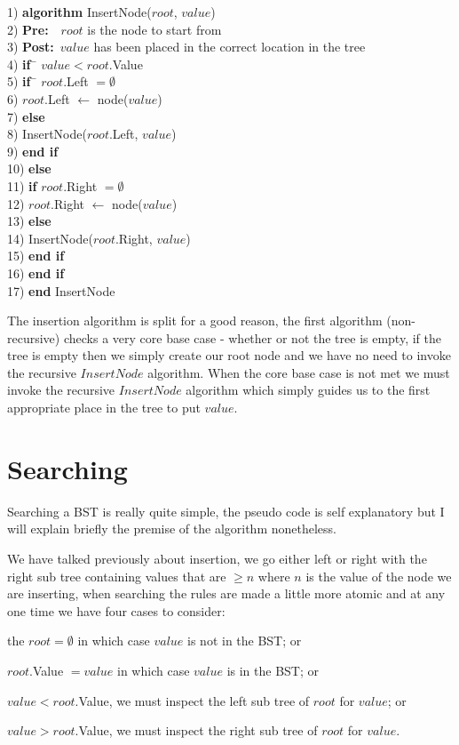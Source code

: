 \begin{tabbing}
1)  \textbf{alg}\= \textbf{orithm} InsertNode($root$, $value$) \\
2)  \> \textbf{Pre:}~~$root$ is the node to start from \\
3)  \> \textbf{Post:}~$value$ has been placed in the correct location in the tree \\
4)  \> \textbf{if}~\= $value < root$.Value \\
5)  \> \> \textbf{if}~\= $root$.Left $= \emptyset$ \\
6)  \> \> \> $root$.Left $\leftarrow$ node($value$) \\
7)  \> \> \textbf{else} \\
8)  \> \> \> InsertNode($root$.Left, $value$) \\
9)  \> \> \textbf{end if} \\
10) \> \textbf{else} \\
11) \> \> \textbf{if} $root$.Right $= \emptyset$ \\
12) \> \> \> $root$.Right $\leftarrow$ node($value$) \\
13) \> \> \textbf{else} \\
14) \> \> \> InsertNode($root$.Right, $value$) \\
15) \> \> \textbf{end if} \\
16) \> \textbf{end if} \\
17) \textbf{end} InsertNode \\ 
\end{tabbing}

The insertion algorithm is split for a good reason, the first algorithm (non-recursive) checks a very core base case - whether or not the tree is empty, if the tree is empty then we simply create our root node and we have no need to invoke the recursive $InsertNode$ algorithm. When the core base case is not met we must invoke the recursive $InsertNode$ algorithm which simply guides us to the first appropriate place in the tree to put $value$.

\section{Searching}
Searching a BST is really quite simple, the pseudo code is self explanatory but I will explain briefly the premise of the algorithm nonetheless.

We have talked previously about insertion, we go either left or right with the right sub tree containing values that are $\geq n$ where $n$ is the value of the node we are inserting, when searching the rules are made a little more atomic and at any one time we have four cases to consider: 
\begin{inparaenum}
\item the $root = \emptyset$ in which case $value$ is not in the BST; or
\item $root$.Value $= value$ in which case $value$ is in the BST; or
\item $value < root$.Value, we must inspect the left sub tree of $root$ for $value$; or
\item $value > root$.Value, we must inspect the right sub tree of $root$ for $value$.
\end{inparaenum}

